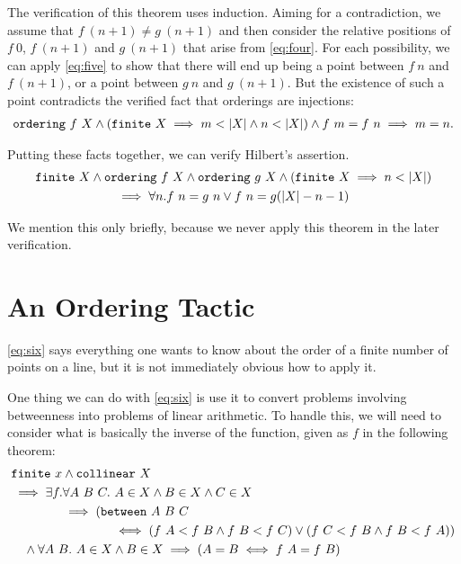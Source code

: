 The verification of this theorem uses induction. Aiming for a contradiction, we assume that $f\ (n+1) \neq g\ (n+1)$ and then consider the relative positions of $f\ 0$, $f\ (n+1)$ and $g\ (n+1)$ that arise from \ref{eq:four}. For each possibility, we can apply \ref{eq:five} to show that there will end up being a point between $f\ n$ and $f\ (n+1)$, or a point between $g\ n$ and $g\ (n+1)$. But the existence of such a point contradicts the verified fact that orderings are injections:
\begin{multline*}
  \texttt{ordering}\ f\ X \wedge (\texttt{finite}\ X \implies m < |X| \wedge n < |X|) \wedge f\ m = f\ n \implies m=n.
\end{multline*}

Putting these facts together, we can verify Hilbert's assertion.
\begin{multline*}
  \texttt{finite}\ X \wedge \texttt{ordering}\ f\ X \wedge \texttt{ordering}\ g\ X \wedge (\texttt{finite}\ X \implies n < |X|)\\
  \implies \forall n. f\ n = g\ n \vee f\ n = g (|X| - n - 1)
\end{multline*}

We mention this only briefly, because we never apply this theorem in the later verification.

\section{An Ordering Tactic}
\ref{eq:six} says everything one wants to know about the order of a finite number of points on a line, but it is not immediately obvious how to apply it.

One thing we can do with \ref{eq:six} is use it to convert problems involving betweenness into problems of linear arithmetic. To handle this, we will need to consider what is basically the inverse of the  function, given as $f$ in the following theorem:
\begin{equation}
\label{eq:OrderInverse}
\begin{split}
  &\texttt{finite}\ x \wedge \texttt{collinear}\ X\\
  &\implies \exists f. \forall A\ B\ C.\ A \in X \wedge B \in X \wedge C \in X \\
  &\qquad\qquad\implies (\texttt{between}\ A\ B\ C \\
  &\qquad\qquad\qquad\qquad\iff (f\ A < f\ B \wedge f\ B < f\ C) \vee (f\ C < f\ B \wedge f\ B < f\ A))\\
  &\quad\wedge \forall A\ B.\ A \in X \wedge B \in X \implies (A = B \iff f\ A = f\ B)
\end{split}
\end{equation}

